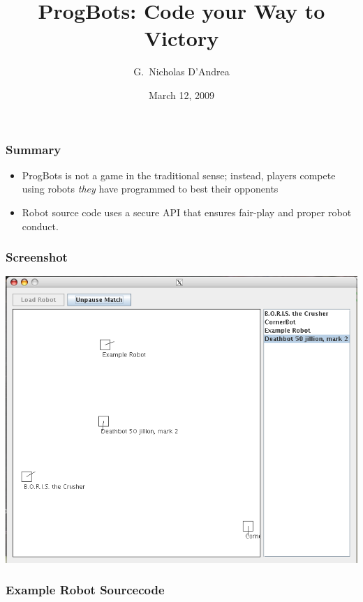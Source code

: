 \documentclass{beamer}
\title{ProgBots: Code your Way to Victory}
\author{G.~Nicholas D'Andrea}
\institute{Drexel University}
\date{March 12, 2009}
\begin{document}
\frame{\titlepage}

\frame
{
    \frametitle{Summary}
    
\begin{itemize}
\item ProgBots is not a game in the traditional sense; instead, players compete
using robots \emph{they} have programmed to best their opponents

\item Robot source code uses a secure API that ensures fair-play and proper 
robot conduct.
\end{itemize}
}

\frame
{
  \frametitle{Screenshot}

\includegraphics[scale=0.4]{screenshot.png}
}

\frame
{
  \frametitle{Example Robot Sourcecode}
  \lstset {language=Java}
  


}
\end{document}
